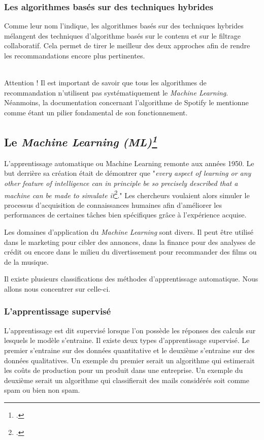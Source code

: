 \documentclass[12pt,a4paper]{article}
\begin{document}
\subsubsection{Les algorithmes basés sur des techniques hybrides}
Comme leur nom l'indique, les algorithmes basés sur des techniques hybrides mélangent des techniques d'algorithme basés sur le contenu et sur le filtrage collaboratif. Cela permet de tirer le meilleur des deux approches afin de rendre les recommandations encore plus pertinentes. 
 
 ~\\
Attention ! Il est important de savoir que tous les algorithmes de recommandation n'utilisent pas systématiquement le \textit{Machine Learning}. Néanmoins, la documentation concernant l'algorithme de Spotify le mentionne comme étant un pilier fondamental de son fonctionnement.  

\subsection{Le \textit{Machine Learning (ML)\footcite{Portugal2018}}}
L'apprentissage automatique ou Machine Learning remonte aux années 1950. Le but derrière sa création était de démontrer que "\textit{every aspect of learning or
any other feature of intelligence can in principle be so precisely described that a machine can be made to simulate it}\footcite{mccarthy1955dartmouth}." Les chercheurs voulaient alors simuler le processus d'acquisition de connaissances humaines afin d'améliorer les performances de certaines tâches bien spécifiques grâce à l'expérience acquise. 

Les domaines d'application du \textit{Machine Learning} sont divers. Il peut être utilisé dans le marketing pour cibler des annonces, dans la finance pour des analyses de crédit ou encore dans le milieu du divertissement pour recommander des films ou de la musique.

Il existe plusieurs classifications des méthodes d'apprentissage automatique. Nous allons nous concentrer sur celle-ci.
\subsubsection{L'apprentissage supervisé}

L'apprentissage est dit supervisé lorsque l'on possède les réponses des calculs sur lesquels le modèle s'entraine. Il existe deux types d'apprentissage supervisé. Le premier s'entraine sur des données quantitative et le deuxième s'entraine sur des données qualitatives. 
Un exemple du premier serait un algorithme qui estimerait les coûts de production pour un produit dans une entreprise. Un exemple du deuxième serait un algorithme qui classifierait des mails considérés soit comme spam ou bien non spam. 
	
\end{document}
